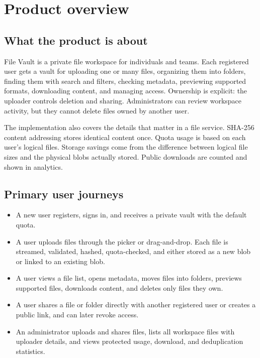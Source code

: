 \documentclass[11pt,a4paper]{article}
\begin{document}
\section{Product overview}
\subsection{What the product is about}
File Vault is a private file workspace for individuals and teams. Each registered user gets a vault for uploading one or many files, organizing them into folders, finding them with search and filters, checking metadata, previewing supported formats, downloading content, and managing access. Ownership is explicit: the uploader controls deletion and sharing. Administrators can review workspace activity, but they cannot delete files owned by another user.

The implementation also covers the details that matter in a file service. SHA-256 content addressing stores identical content once. Quota usage is based on each user's logical files. Storage savings come from the difference between logical file sizes and the physical blobs actually stored. Public downloads are counted and shown in analytics.

\subsection{Primary user journeys}
\begin{itemize}
\item A new user registers, signs in, and receives a private vault with the default quota.
\item A user uploads files through the picker or drag-and-drop. Each file is streamed, validated, hashed, quota-checked, and either stored as a new blob or linked to an existing blob.
\item A user views a file list, opens metadata, moves files into folders, previews supported files, downloads content, and deletes only files they own.
\item A user shares a file or folder directly with another registered user or creates a public link, and can later revoke access.
\item An administrator uploads and shares files, lists all workspace files with uploader details, and views protected usage, download, and deduplication statistics.
\end{itemize}
\end{document}

